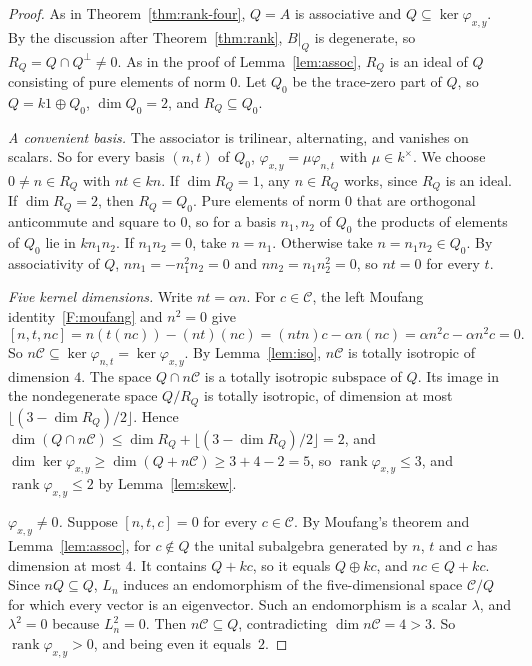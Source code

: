 \documentclass[11pt]{amsart}
\theoremstyle{definition}
\theoremstyle{remark}
\newcommand{\C}{\mathcal{C}}
\newcommand{\assoc}[3]{[#1,#2,#3]}
\DeclareMathOperator{\rank}{rank}
\begin{document}
\begin{proof}
As in Theorem~\ref{thm:rank-four}, $Q=A$ is associative and
$Q\subseteq\ker\varphi_{x,y}$. By the discussion after Theorem~\ref{thm:rank},
$B|_Q$ is degenerate, so $R_Q=Q\cap Q^\perp\neq0$. As in the proof of
Lemma~\ref{lem:assoc}, $R_Q$ is an ideal of $Q$ consisting of pure elements of
norm $0$. Let $Q_0$ be the trace-zero part of $Q$, so $Q=k1\oplus Q_0$,
$\dim Q_0=2$, and $R_Q\subseteq Q_0$.

\emph{A convenient basis.} The associator is trilinear, alternating, and
vanishes on scalars. So for every basis $(n,t)$ of $Q_0$,
$\varphi_{x,y}=\mu\varphi_{n,t}$ with $\mu\in k^\times$. We choose
$0\neq n\in R_Q$ with $nt\in kn$. If $\dim R_Q=1$, any $n\in R_Q$ works, since
$R_Q$ is an ideal. If $\dim R_Q=2$, then $R_Q=Q_0$. Pure elements of norm $0$
that are orthogonal anticommute and square to $0$, so for a basis $n_1,n_2$ of
$Q_0$ the products of elements of $Q_0$ lie in $kn_1n_2$. If $n_1n_2=0$, take
$n=n_1$. Otherwise take $n=n_1n_2\in Q_0$. By associativity of $Q$,
$nn_1=-n_1^2n_2=0$ and $nn_2=n_1n_2^2=0$, so $nt=0$ for every $t$.

\emph{Five kernel dimensions.} Write $nt=\alpha n$. For $c\in\C$, the left
Moufang identity~\ref{F:moufang} and $n^2=0$ give
\[
  \assoc nt{nc}=n(t(nc))-(nt)(nc)=(ntn)c-\alpha n(nc)
  =\alpha n^2c-\alpha n^2c=0.
\]
So $n\C\subseteq\ker\varphi_{n,t}=\ker\varphi_{x,y}$. By
Lemma~\ref{lem:iso}, $n\C$ is totally isotropic of dimension $4$. The space
$Q\cap n\C$ is a totally isotropic subspace of $Q$. Its image in the
nondegenerate space $Q/R_Q$ is totally isotropic, of dimension at most
$\lfloor(3-\dim R_Q)/2\rfloor$. Hence
$\dim(Q\cap n\C)\le\dim R_Q+\lfloor(3-\dim R_Q)/2\rfloor=2$, and
$\dim\ker\varphi_{x,y}\ge\dim(Q+n\C)\ge3+4-2=5$, so
$\rank\varphi_{x,y}\le3$, and $\rank\varphi_{x,y}\le2$ by
Lemma~\ref{lem:skew}.

\emph{$\varphi_{x,y}\neq0$.} Suppose $\assoc ntc=0$ for every $c\in\C$. By
Moufang's theorem and Lemma~\ref{lem:assoc}, for $c\notin Q$ the unital
subalgebra generated by $n$, $t$ and $c$ has dimension at most $4$. It
contains $Q+kc$, so it equals $Q\oplus kc$, and $nc\in Q+kc$. Since
$nQ\subseteq Q$, $L_n$ induces an endomorphism of the five-dimensional space
$\C/Q$ for which every vector is an eigenvector. Such an endomorphism is a
scalar $\lambda$, and $\lambda^2=0$ because $L_n^2=0$. Then
$n\C\subseteq Q$, contradicting $\dim n\C=4>3$. So $\rank\varphi_{x,y}>0$,
and being even it equals~$2$.
\end{proof}
\end{document}
